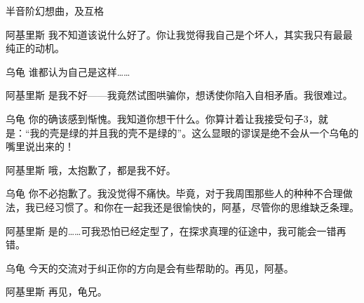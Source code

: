 \begin{dialog}{半音阶幻想曲，及互格}
\begin{dialogue}
\item[阿基里斯]我不知道该说什么好了。你让我觉得我自己是个坏人，其实我只有最最纯正的动机。

\item[乌龟]谁都认为自己是这样……

\item[阿基里斯]是我不好——我竟然试图哄骗你，想诱使你陷入自相矛盾。我很难过。

\item[乌龟]你的确该感到惭愧。我知道你想干什么。你算计着让我接受句子3，就是：“我的壳是绿的并且我的壳不是绿的”。这么显眼的谬误是绝不会从一个乌龟的嘴里说出来的！

\item[阿基里斯]哦，太抱歉了，都是我不好。

\item[乌龟]你不必抱歉了。我没觉得不痛快。毕竟，对于我周围那些人的种种不合理做法，我已经习惯了。和你在一起我还是很愉快的，阿基，尽管你的思维缺乏条理。

\item[阿基里斯]是的……可我恐怕已经定型了，在探求真理的征途中，我可能会一错再错。

\item[乌龟]今天的交流对于纠正你的方向是会有些帮助的。再见，阿基。

\item[阿基里斯]再见，龟兄。

\end{dialogue}

\end{dialog}
